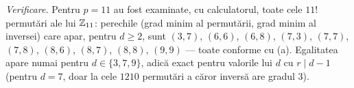 \begin{solutie}
\emph{Verificare.} Pentru $p=11$ au fost examinate, cu calculatorul, toate cele $11!$ permutări ale lui $\mathbb{Z}_{11}$: perechile (grad minim al permutării, grad minim al inversei) care apar, pentru $d\ge 2$, sunt $(3,7)$, $(6,6)$, $(6,8)$, $(7,3)$, $(7,7)$, $(7,8)$, $(8,6)$, $(8,7)$, $(8,8)$, $(9,9)$ --- toate conforme cu (a). Egalitatea apare numai pentru $d\in\{3,7,9\}$, adică exact pentru valorile lui $d$ cu $r\mid d-1$ (pentru $d=7$, doar la cele $1210$ permutări a căror inversă are gradul $3$).
\end{solutie}
